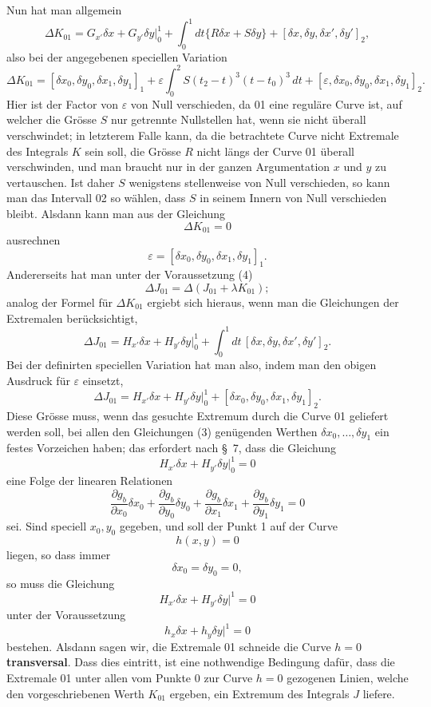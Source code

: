 \documentclass[11pt,a4paper,leqno]{article}
\begin{document}
Nun hat man allgemein
\[
\Delta K_{01}=G_{x'}\delta x+G_{y'}\delta y\bigg|_0^1+
\int_0^1dt\{R\delta x+S\delta y\}
+[\delta x,\delta y,\delta x',\delta y']_2,
\]
also bei der angegebenen speciellen Variation
\[
\Delta K_{01}=[\delta x_0,\delta y_0,\delta x_1,\delta y_1]_1+
\varepsilon\int_0^2S(t_2-t)^3(t-t_0)^3\,dt
+[\varepsilon,\delta x_0,\delta y_0,\delta x_1,\delta y_1]_2.
\]
Hier ist der Factor von $\varepsilon$ von Null verschieden, da 01 eine reguläre Curve ist, auf welcher die Grösse $S$ nur getrennte Nullstellen hat, wenn sie nicht überall verschwindet; in letzterem Falle kann, da die betrachtete Curve nicht Extremale des Integrals $K$ sein soll, die Grösse $R$ nicht längs der Curve 01 überall verschwinden, und man braucht nur in der ganzen Argumentation $x$ und $y$ zu vertauschen. Ist daher $S$ wenigstens stellenweise von Null verschieden, so kann man das Intervall 02 so wählen, dass $S$ in seinem Innern von Null verschieden bleibt. Alsdann kann man aus der Gleichung
\begin{equation}\tag{4}
\Delta K_{01}=0
\end{equation}
ausrechnen
\[
\varepsilon=[\delta x_0,\delta y_0,\delta x_1,\delta y_1]_1.
\]
Andererseits hat man unter der Voraussetzung (4)
\[
\Delta J_{01}=\Delta(J_{01}+\lambda K_{01});
\]
analog der Formel für $\Delta K_{01}$ ergiebt sich hieraus, wenn man die Gleichungen der Extremalen berücksichtigt,
\[
\Delta J_{01}=H_{x'}\delta x+H_{y'}\delta y\bigg|_0^1+
\int_0^1dt\,[\delta x,\delta y,\delta x',\delta y']_2.
\]
Bei der definirten speciellen Variation hat man also, indem man den obigen Ausdruck für $\varepsilon$ einsetzt,
\[
\Delta J_{01}=H_{x'}\delta x+H_{y'}\delta y\bigg|_0^1+
[\delta x_0,\delta y_0,\delta x_1,\delta y_1]_2.
\]
Diese Grösse muss, wenn das gesuchte Extremum durch die Curve 01 geliefert werden soll, bei allen den Gleichungen (3) genügenden Werthen $\delta x_0,\ldots,\delta y_1$ ein festes Vorzeichen haben; das erfordert nach \S~7, dass die Gleichung
\[
H_{x'}\delta x+H_{y'}\delta y\bigg|_0^1=0
\]
eine Folge der linearen Relationen
\[
\frac{\partial g_b}{\partial x_0}\delta x_0+
\frac{\partial g_b}{\partial y_0}\delta y_0+
\frac{\partial g_b}{\partial x_1}\delta x_1+
\frac{\partial g_b}{\partial y_1}\delta y_1=0
\]
sei. Sind speciell $x_0,y_0$ gegeben, und soll der Punkt 1 auf der Curve
\[
h(x,y)=0
\]
liegen, so dass immer
\[
\delta x_0=\delta y_0=0,
\]
so muss die Gleichung
\[
H_{x'}\delta x+H_{y'}\delta y\bigg|^1=0
\]
unter der Voraussetzung
\[
h_x\delta x+h_y\delta y\bigg|^1=0
\]
bestehen. Alsdann sagen wir, die Extremale 01 schneide die Curve $h=0$ \textbf{transversal}. Dass dies eintritt, ist eine nothwendige Bedingung dafür, dass die Extremale 01 unter allen vom Punkte 0 zur Curve $h=0$ gezogenen Linien, welche den vorgeschriebenen Werth $K_{01}$ ergeben, ein Extremum des Integrals $J$ liefere.
\end{document}
